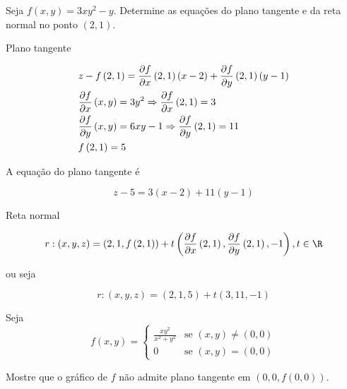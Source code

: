 \documentclass{book}
\begin{document}
\begin{ex}
Seja $f\left( {x,y} \right) = 3xy^2  - y$. Determine as equa\c c\~oes do plano tangente e da reta normal no ponto $(2,1)$.
\end{ex}

\newpage 

\begin{sol}
Plano tangente

\[
\begin{gathered}
z - f\left( {2,1} \right) = \frac{{\partial f}}
{{\partial x}}\left( {2,1} \right)\left( {x - 2} \right) + \frac{{\partial f}}
{{\partial y}}\left( {2,1} \right)\left( {y - 1} \right) \hfill \\
  \frac{{\partial f}}{{\partial x}}\left( {x,y} \right) = 3y^2 \Rightarrow \frac{{\partial f}}
{{\partial x}}\left( {2,1} \right) = 3 \hfill \\
\frac{{\partial f}}
{{\partial y}}\left( {x,y} \right) = 6xy - 1   \Rightarrow \frac{{\partial f}}
{{\partial y}}\left( {2,1} \right) = 11 \hfill \\
f\left( {2,1} \right) = 5 \hfill \\
\end{gathered}
\]

A equa\c c\~ao do plano tangente \'e

\[
z - 5 = 3\left( {x - 2} \right) + 11\left( {y - 1} \right)
\]

Reta normal

\[
r: \left( {x,y,z} \right) = \left( {2,1,f\left( {2,1} \right)} \right) + t\left( {\frac{{\partial f}}
{{\partial x}}\left( {2,1} \right),\frac{{\partial f}}
{{\partial y}}\left( {2,1} \right), - 1} \right),t \in \R
\]

ou seja

\[
    r:\left( {x,y,z} \right) = \left( {2,1,5} \right) + t\left( {3,11, - 1} \right)
\]

\end{sol}

\begin{ex}
Seja
\begin{equation*}
f(x,y)=\left\{ \begin{array}{cl}\displaystyle
        \frac{{xy^2}}{{x^2 + y^2 }} & \textrm{se }\left( {x,y} \right) \ne \left( {0,0} \right)\\
        0 & \textrm{se }\left( {x,y} \right) = \left( {0,0} \right)\end{array}\right.
\end{equation*}

    Mostre que o gr\'afico de $f$ n\~ao admite plano tangente em $\left( {0,0,f\left( {0,0} \right)} \right)$.
\end{ex}
\end{document}
